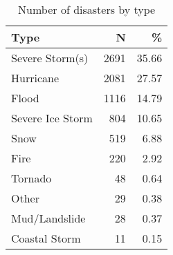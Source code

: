 \begin{table}

\caption{\label{tab:DisasterTypes}Number of disasters by type}
\centering
\begin{tabular}[t]{lrr}
\toprule
Type & N & \%\\
\midrule
Severe Storm(s) & 2691 & 35.66\\
Hurricane & 2081 & 27.57\\
Flood & 1116 & 14.79\\
Severe Ice Storm & 804 & 10.65\\
Snow & 519 & 6.88\\
Fire & 220 & 2.92\\
Tornado & 48 & 0.64\\
Other & 29 & 0.38\\
Mud/Landslide & 28 & 0.37\\
Coastal Storm & 11 & 0.15\\
\bottomrule
\end{tabular}
\end{table}
